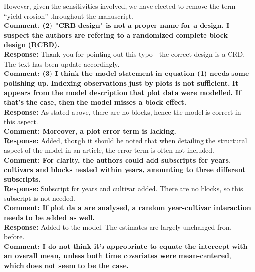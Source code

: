 \documentclass{article} \usepackage[margin=1in]{geometry}
\begin{document}
However, given the sensitivities involved, we have elected to remove
the term ``yield erosion'' throughout the manuscript.\\

\textbf{Comment: (2) "CRB design" is not a proper name for a design. I
  suspect the authors are refering to a randomized complete block
  design (RCBD).}\\

\textbf{Response:} Thank you for pointing out this typo - the correct
design is a CRD. The text has been update accordingly.\\

\textbf{Comment: (3) I think the model statement in equation (1) needs
  some polishing up. Indexing observations just by plots is not
  sufficient. It appears from the model description that plot data
  were modelled. If that's the case, then the model misses a block
  effect.}\\

\textbf{Response:} As stated above, there are no blocks, hence the
model is correct in this aspect.\\

\textbf{Comment: Moreover, a plot error term is lacking.}\\

\textbf{Response:} Added, though it should be noted that when
detailing the structural aspect of the model in an article, the error
term is often not included. \\

\textbf{Comment: For clarity, the authors could add subscripts for
  years, cultivars and blocks nested within years, amounting to three
  different subscripts.}\\

\textbf{Response:} Subscript for years and cultivar added. There are
no blocks, so this subscript is not needed.\\

\textbf{Comment: If plot data are analysed, a random year-cultivar
  interaction needs to be added as well.}\\

\textbf{Response:} Added to the model. The estimates are largely
unchanged from before.\\

\textbf{Comment: I do not think it's appropriate to equate the
  intercept with an overall mean, unless both time covariates were
  mean-centered, which does not seem to be the case.}\\
\end{document}
